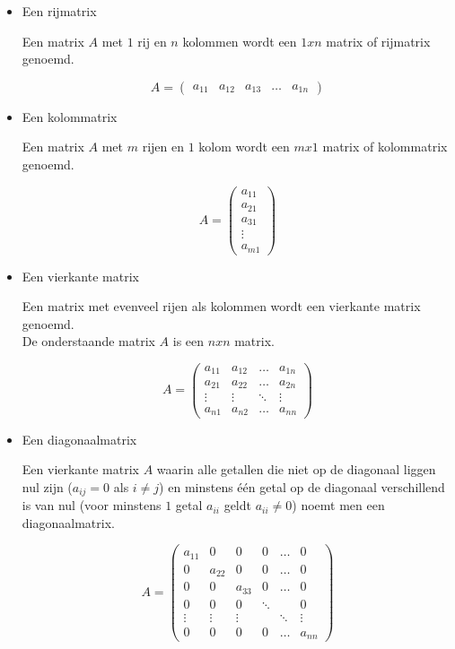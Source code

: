 \begin{itemize}
\item{Een rijmatrix}

Een matrix $A$ met $1$ rij en $n$ kolommen wordt een $1xn$ matrix of rijmatrix genoemd.

\[
A= \left( \begin{matrix}
a_{11} & a_{12} & a_{13} & \ldots & a_{1n}
\end{matrix} \right)
\]

\item{Een kolommatrix}

Een matrix $A$ met $m$ rijen en $1$ kolom wordt een $mx1$ matrix of kolommatrix genoemd.

\[
A= \left( \begin{matrix}
a_{11} \\
a_{21} \\
a_{31} \\
\vdots \\
a_{m1}
\end{matrix} \right)
\]

\item{Een vierkante matrix}

Een matrix met evenveel rijen als kolommen wordt een vierkante matrix genoemd.\\ De onderstaande matrix $A$ is een $nxn$ matrix.

\[
A= \left( \begin{matrix}
a_{11} & a_{12} & \ldots & a_{1n} \\
a_{21} & a_{22} & \ldots & a_{2n} \\
\vdots & \vdots & \ddots & \vdots \\
a_{n1} & a_{n2} & \ldots & a_{nn}
\end{matrix} \right)
\]

\item{Een diagonaalmatrix}

Een vierkante matrix $A$ waarin alle getallen die niet op de diagonaal liggen nul zijn ($a_{ij}=0$ als $i \neq j$) en minstens \'{e}\'{e}n getal op de diagonaal verschillend is van nul (voor minstens $1$ getal $a_{ii}$ geldt $a_{ii} \neq 0$) noemt men een diagonaalmatrix.

\[
A= \left( \begin{matrix}
a_{11} & 0 & 0 & 0 & \ldots & 0 \\
0  & a_{22} & 0 & 0 & \ldots & 0 \\
0 & 0 & a_{33} & 0 & \ldots & 0 \\
0 & 0 & 0 & \ddots &  & 0 \\
\vdots & \vdots & \vdots &  & \ddots & \vdots \\
0 & 0 & 0 & 0 & \ldots & a_{nn}
\end{matrix} \right)
\]


\end{itemize}
